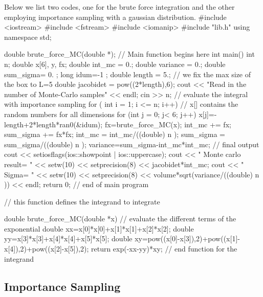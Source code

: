 \documentclass[%
oneside,                 %
final,                   %
10pt]{article}
\newenvironment{block_mdfboxadmon}[1][]{
\begin{block_mdfboxmdframed}[frametitle=#1]
}
{
\end{block_mdfboxmdframed}
}
\begin{document}
\begin{block_mdfboxadmon}[]
Below we list two codes, one for the brute force integration
and the other employing importance sampling with a gaussian distribution.
\bcppcod
#include <iostream>
#include <fstream>
#include <iomanip>
#include "lib.h"
using namespace std;

double brute_force_MC(double *);
//     Main function begins here     
int main()
{
     int n;
     double x[6], y, fx; 
     double int_mc = 0.;  double variance = 0.;
     double sum_sigma= 0. ; long idum=-1 ;  
     double length = 5.; // we fix the max size of the box to L=5
     double jacobidet = pow((2*length),6);
     cout << "Read in the number of Monte-Carlo samples" << endl;
     cin >> n;
//   evaluate the integral with importance sampling    
     for ( int i = 1;  i <= n; i++){
//   x[] contains the random numbers for all dimensions
       for (int j = 0; j< 6; j++) {
           x[j]=-length+2*length*ran0(&idum);
       }
       fx=brute_force_MC(x); 
       int_mc += fx;
       sum_sigma += fx*fx;
     }
     int_mc = int_mc/((double) n );
     sum_sigma = sum_sigma/((double) n );
     variance=sum_sigma-int_mc*int_mc;
//   final output 
      cout << setiosflags(ios::showpoint | ios::uppercase);
      cout << " Monte carlo result= " << setw(10) << setprecision(8) << jacobidet*int_mc;
      cout << " Sigma= " << setw(10) << setprecision(8) << volume*sqrt(variance/((double) n )) << endl;
     return 0;
}  // end of main program 

// this function defines the integrand to integrate 
 
double  brute_force_MC(double *x) 
{
// evaluate the different terms of the exponential
   double xx=x[0]*x[0]+x[1]*x[1]+x[2]*x[2];
   double yy=x[3]*x[3]+x[4]*x[4]+x[5]*x[5];
   double xy=pow((x[0]-x[3]),2)+pow((x[1]-x[4]),2)+pow((x[2]-x[5]),2);
   return exp(-xx-yy)*xy;
} // end function for the integrand
\ecppcod
\end{block_mdfboxadmon} %



\subsection{Importance Sampling}
\end{document}
